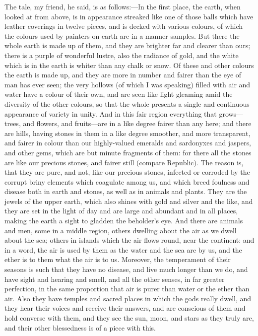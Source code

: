 \documentclass[11pt,letter]{article}
\begin{document}
\par  The tale, my friend, he said, is as follows:—In the first place, the earth, when looked at from above, is in appearance streaked like one of those balls which have leather coverings in twelve pieces, and is decked with various colours, of which the colours used by painters on earth are in a manner samples. But there the whole earth is made up of them, and they are brighter far and clearer than ours; there is a purple of wonderful lustre, also the radiance of gold, and the white which is in the earth is whiter than any chalk or snow. Of these and other colours the earth is made up, and they are more in number and fairer than the eye of man has ever seen; the very hollows (of which I was speaking) filled with air and water have a colour of their own, and are seen like light gleaming amid the diversity of the other colours, so that the whole presents a single and continuous appearance of variety in unity. And in this fair region everything that grows—trees, and flowers, and fruits—are in a like degree fairer than any here; and there are hills, having stones in them in a like degree smoother, and more transparent, and fairer in colour than our highly-valued emeralds and sardonyxes and jaspers, and other gems, which are but minute fragments of them: for there all the stones are like our precious stones, and fairer still (compare Republic). The reason is, that they are pure, and not, like our precious stones, infected or corroded by the corrupt briny elements which coagulate among us, and which breed foulness and disease both in earth and stones, as well as in animals and plants. They are the jewels of the upper earth, which also shines with gold and silver and the like, and they are set in the light of day and are large and abundant and in all places, making the earth a sight to gladden the beholder's eye. And there are animals and men, some in a middle region, others dwelling about the air as we dwell about the sea; others in islands which the air flows round, near the continent: and in a word, the air is used by them as the water and the sea are by us, and the ether is to them what the air is to us. Moreover, the temperament of their seasons is such that they have no disease, and live much longer than we do, and have sight and hearing and smell, and all the other senses, in far greater perfection, in the same proportion that air is purer than water or the ether than air. Also they have temples and sacred places in which the gods really dwell, and they hear their voices and receive their answers, and are conscious of them and hold converse with them, and they see the sun, moon, and stars as they truly are, and their other blessedness is of a piece with this.
\end{document}
